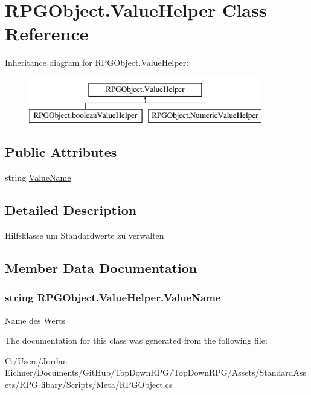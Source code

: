 \hypertarget{class_r_p_g_object_1_1_value_helper}{}\section{R\+P\+G\+Object.\+Value\+Helper Class Reference}
\label{class_r_p_g_object_1_1_value_helper}
Inheritance diagram for R\+P\+G\+Object.\+Value\+Helper\+:\begin{figure}[H]
\begin{center}
\leavevmode
\includegraphics[height=2.000000cm]{class_r_p_g_object_1_1_value_helper}
\end{center}
\end{figure}
\subsection*{Public Attributes}
\begin{DoxyCompactItemize}
\item 
string \hyperlink{class_r_p_g_object_1_1_value_helper_a7e533defe95f542b339bc1a8accab645}{Value\+Name}
\end{DoxyCompactItemize}


\subsection{Detailed Description}
Hilfsklasse um Standardwerte zu verwalten 

\subsection{Member Data Documentation}
\hypertarget{class_r_p_g_object_1_1_value_helper_a7e533defe95f542b339bc1a8accab645}{}
\subsubsection[{Value\+Name}]{\setlength{\rightskip}{0pt plus 5cm}string R\+P\+G\+Object.\+Value\+Helper.\+Value\+Name}\label{class_r_p_g_object_1_1_value_helper_a7e533defe95f542b339bc1a8accab645}
Name des Werts 

The documentation for this class was generated from the following file\+:\begin{DoxyCompactItemize}
\item 
C\+:/\+Users/\+Jordan Eichner/\+Documents/\+Git\+Hub/\+Top\+Down\+R\+P\+G/\+Top\+Down\+R\+P\+G/\+Assets/\+Standard\+Assets/\+R\+P\+G libary/\+Scripts/\+Meta/R\+P\+G\+Object.\+cs\end{DoxyCompactItemize}
